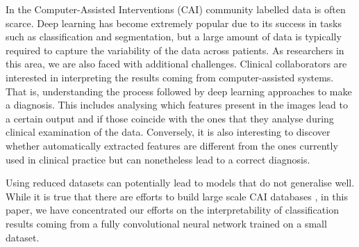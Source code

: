 \documentclass[runningheads]{llncs}
\begin{document}
In the Computer-Assisted Interventions (CAI) community labelled data is often scarce. 
Deep learning has become extremely popular due to its success in tasks such as classification and segmentation, but a large amount of data is typically required to capture the variability of the data across patients.
As researchers in this area, we are also faced with additional challenges. Clinical collaborators are interested in interpreting the results coming from computer-assisted systems. That is, understanding the process followed by deep learning approaches to make a diagnosis. This includes analysing which features present in the images lead to a certain output and if those coincide with the ones that they analyse during clinical examination of the data. Conversely, it is also interesting to discover whether automatically extracted features are different from the ones currently used in clinical practice but can nonetheless lead to a correct diagnosis.


Using reduced datasets can potentially lead to models that do not generalise well. While it is true that there are efforts to build large scale CAI databases \cite{Maier-Hein2017a}, in this paper, we have concentrated our efforts on the interpretability of classification results coming from a fully convolutional neural network trained on a small dataset. 
\end{document}
